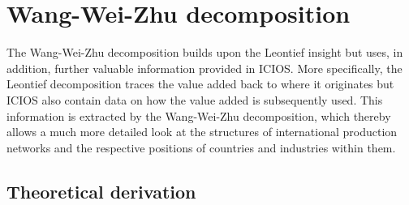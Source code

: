 \documentclass[a4paper]{article}\usepackage[]{graphicx}\usepackage[]{color}
\begin{document}
\section{Wang-Wei-Zhu decomposition}
\label{sec:wwz}
The Wang-Wei-Zhu decomposition builds upon the Leontief insight but uses, in addition, further valuable information
provided in ICIOS.
More specifically, the Leontief decomposition traces the value added back to where it originates but ICIOS also contain data on how the value added is subsequently used.
This information is extracted by the Wang-Wei-Zhu decomposition, which thereby allows a much more detailed look at the structures of international production networks and the respective positions of countries and industries within them.

\subsection{Theoretical derivation}
\end{document}
